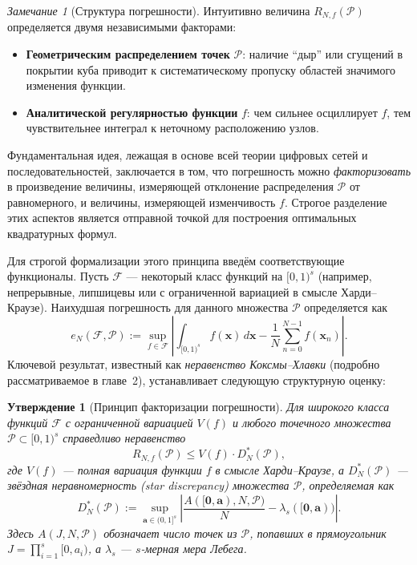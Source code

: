 \documentclass[12pt, a4paper]{article}
\theoremstyle{plain}
\newtheorem{proposition}[theorem]{Утверждение}
\theoremstyle{definition}
\theoremstyle{remark}
\newtheorem{remark}[theorem]{Замечание}
\newcommand{\II}{[0, 1)}
\newcommand{\PP}{\mathcal{P}}
\newcommand{\va}{\boldsymbol{a}}
\newcommand{\vx}{\boldsymbol{x}}
\newcommand{\vzero}{\boldsymbol{0}}
\begin{document}
\begin{remark}[Структура погрешности]
Интуитивно величина $R_{N,f}(\PP)$ определяется двумя независимыми факторами:
\begin{itemize}
    \item \textbf{Геометрическим распределением точек} $\PP$: наличие ``дыр'' или сгущений в покрытии куба приводит к систематическому пропуску областей значимого изменения функции.
    \item \textbf{Аналитической регулярностью функции} $f$: чем сильнее осциллирует $f$, тем чувствительнее интеграл к неточному расположению узлов.
\end{itemize}
Фундаментальная идея, лежащая в основе всей теории цифровых сетей и последовательностей, заключается в том, что погрешность можно \textit{факторизовать} в произведение величины, измеряющей отклонение распределения $\PP$ от равномерного, и величины, измеряющей изменчивость $f$. Строгое разделение этих аспектов является отправной точкой для построения оптимальных квадратурных формул.
\end{remark}

Для строгой формализации этого принципа введём соответствующие функционалы. Пусть $\mathcal{F}$ --- некоторый класс функций на $\II^s$ (например, непрерывные, липшицевы или с ограниченной вариацией в смысле Харди--Краузе). Наихудшая погрешность для данного множества $\PP$ определяется как
\[
e_N(\mathcal{F}, \PP) := \sup_{f \in \mathcal{F}} \left| \int_{\II^s} f(\vx) \, d\vx - \frac{1}{N} \sum_{n=0}^{N-1} f(\vx_n) \right|.
\]
Ключевой результат, известный как \textit{неравенство Коксмы--Хлавки} (подробно рассматриваемое в главе~2), устанавливает следующую структурную оценку:

\begin{proposition}[Принцип факторизации погрешности]
Для широкого класса функций $\mathcal{F}$ с ограниченной вариацией $V(f)$ и любого точечного множества $\PP \subset \II^s$ справедливо неравенство
\[
R_{N,f}(\PP) \le V(f) \cdot D_N^*(\PP),
\]
где $V(f)$ --- полная вариация функции $f$ в смысле Харди--Краузе, а $D_N^*(\PP)$ --- звёздная неравномерность (star discrepancy) множества $\PP$, определяемая как
\[
D_N^*(\PP) := \sup_{\va \in (0,1]^s} \left| \frac{A([\vzero, \va), N, \PP)}{N} - \lambda_s([\vzero, \va)) \right|.
\]
Здесь $A(J, N, \PP)$ обозначает число точек из $\PP$, попавших в прямоугольник $J = \prod_{i=1}^s [0, a_i)$, а $\lambda_s$ --- $s$-мерная мера Лебега.
\end{proposition}
\end{document}
